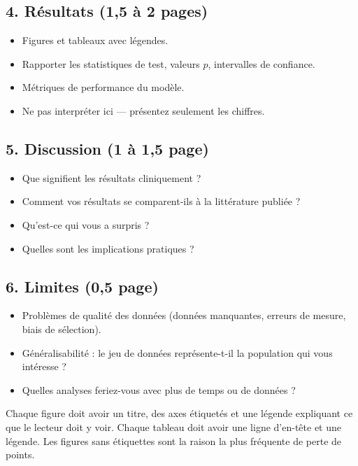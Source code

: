 \subsection{4. R\'esultats (1,5 \`a 2 pages)}

\begin{itemize}
  \item Figures et tableaux avec l\'egendes.
  \item Rapporter les statistiques de test, valeurs $p$, intervalles de confiance.
  \item M\'etriques de performance du mod\`ele.
  \item Ne pas interpr\'eter ici --- pr\'esentez seulement les chiffres.
\end{itemize}

\subsection{5. Discussion (1 \`a 1,5 page)}

\begin{itemize}
  \item Que signifient les r\'esultats cliniquement ?
  \item Comment vos r\'esultats se comparent-ils \`a la litt\'erature publi\'ee ?
  \item Qu'est-ce qui vous a surpris ?
  \item Quelles sont les implications pratiques ?
\end{itemize}

\subsection{6. Limites (0,5 page)}

\begin{itemize}
  \item Probl\`emes de qualit\'e des donn\'ees (donn\'ees manquantes, erreurs de mesure, biais de s\'election).
  \item G\'en\'eralisabilit\'e : le jeu de donn\'ees repr\'esente-t-il la population qui vous int\'eresse ?
  \item Quelles analyses feriez-vous avec plus de temps ou de donn\'ees ?
\end{itemize}

\begin{warningbox}
Chaque figure doit avoir un titre, des axes \'etiquet\'es et une l\'egende expliquant ce que le lecteur doit y voir. Chaque tableau doit avoir une ligne d'en-t\^ete et une l\'egende. Les figures sans \'etiquettes sont la raison la plus fr\'equente de perte de points.
\end{warningbox}

